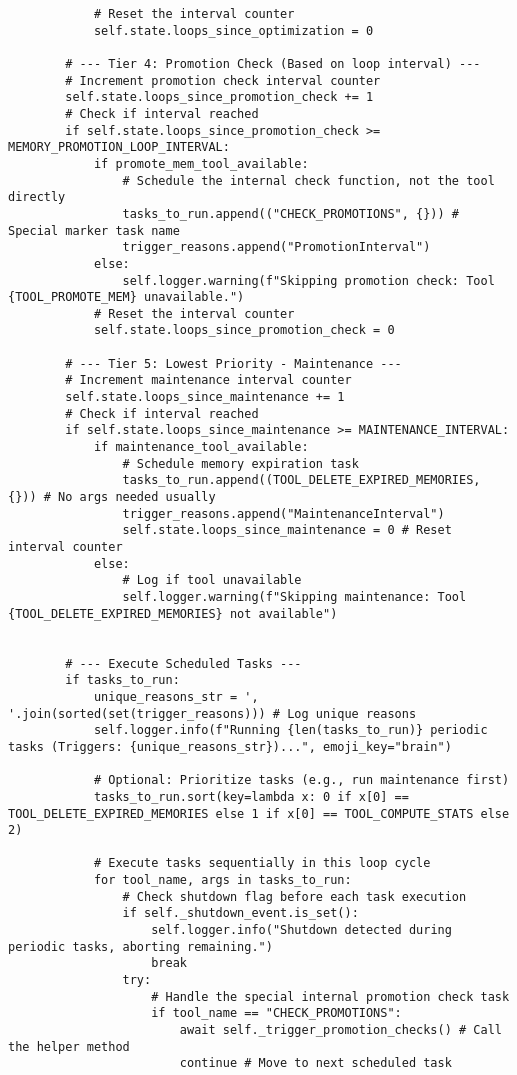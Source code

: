 \documentclass[12pt,a4paper]{article}
\begin{document}
\begin{pageablecode}
\begin{verbatim}
            # Reset the interval counter
            self.state.loops_since_optimization = 0

        # --- Tier 4: Promotion Check (Based on loop interval) ---
        # Increment promotion check interval counter
        self.state.loops_since_promotion_check += 1
        # Check if interval reached
        if self.state.loops_since_promotion_check >= MEMORY_PROMOTION_LOOP_INTERVAL:
            if promote_mem_tool_available:
                # Schedule the internal check function, not the tool directly
                tasks_to_run.append(("CHECK_PROMOTIONS", {})) # Special marker task name
                trigger_reasons.append("PromotionInterval")
            else:
                self.logger.warning(f"Skipping promotion check: Tool {TOOL_PROMOTE_MEM} unavailable.")
            # Reset the interval counter
            self.state.loops_since_promotion_check = 0

        # --- Tier 5: Lowest Priority - Maintenance ---
        # Increment maintenance interval counter
        self.state.loops_since_maintenance += 1
        # Check if interval reached
        if self.state.loops_since_maintenance >= MAINTENANCE_INTERVAL:
            if maintenance_tool_available:
                # Schedule memory expiration task
                tasks_to_run.append((TOOL_DELETE_EXPIRED_MEMORIES, {})) # No args needed usually
                trigger_reasons.append("MaintenanceInterval")
                self.state.loops_since_maintenance = 0 # Reset interval counter
            else:
                # Log if tool unavailable
                self.logger.warning(f"Skipping maintenance: Tool {TOOL_DELETE_EXPIRED_MEMORIES} not available")


        # --- Execute Scheduled Tasks ---
        if tasks_to_run:
            unique_reasons_str = ', '.join(sorted(set(trigger_reasons))) # Log unique reasons
            self.logger.info(f"Running {len(tasks_to_run)} periodic tasks (Triggers: {unique_reasons_str})...", emoji_key="brain")

            # Optional: Prioritize tasks (e.g., run maintenance first)
            tasks_to_run.sort(key=lambda x: 0 if x[0] == TOOL_DELETE_EXPIRED_MEMORIES else 1 if x[0] == TOOL_COMPUTE_STATS else 2)

            # Execute tasks sequentially in this loop cycle
            for tool_name, args in tasks_to_run:
                # Check shutdown flag before each task execution
                if self._shutdown_event.is_set():
                    self.logger.info("Shutdown detected during periodic tasks, aborting remaining.")
                    break
                try:
                    # Handle the special internal promotion check task
                    if tool_name == "CHECK_PROMOTIONS":
                        await self._trigger_promotion_checks() # Call the helper method
                        continue # Move to next scheduled task


\end{verbatim}
\end{pageablecode}
\end{document}
